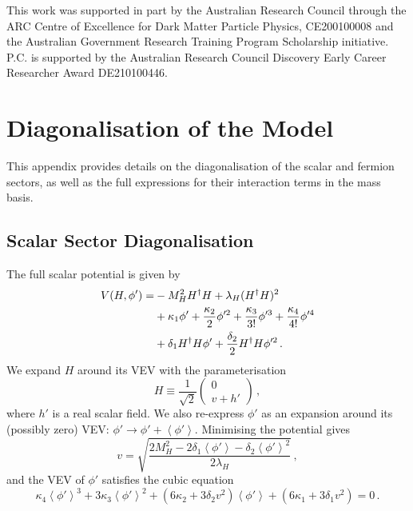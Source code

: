 \documentclass[aps, prd, reprint, nofootinbib, amsmath, amssymb, floatfix]{revtex4-2}
\newcommand{\vev}[1]{\left< #1 \right>}      %
\begin{document}

\begin{acknowledgments}
This work was supported in part by the Australian Research Council through the ARC Centre of Excellence for Dark Matter Particle Physics, CE200100008 and the Australian Government Research Training Program Scholarship initiative. P.C. is supported by the Australian Research Council Discovery Early Career Researcher Award DE210100446.
\end{acknowledgments}



\appendix

\section{\label{app:model_details} Diagonalisation of the Model}

This appendix provides details on the diagonalisation of the scalar and fermion sectors, as well as the full expressions for their interaction terms in the mass basis.


\subsection{Scalar Sector Diagonalisation}

The full scalar potential is given by
%
\begin{align}
    V(H,\phi') = & -M_H^2 H^\dag H + \lambda_H(H^\dag H)^2 \notag \\
    & + \kappa_{1} \phi' + \frac{\kappa_2}{2}\phi'^2 + \frac{\kappa_3}{3!}\phi'^3 + \frac{\kappa_4}{4!}\phi'^4 \notag \\
    & + \delta_1 H^\dag H \phi' + \frac{\delta_2}{2}H^\dag H \phi'^2 \,.
\end{align}
%
We expand $H$ around its VEV with the parameterisation
%
\begin{equation}
    H \equiv \frac{1}{\sqrt{2}} \begin{pmatrix}0 \\ v + h'\end{pmatrix} \,,
\end{equation}
%
where $h'$ is a real scalar field. We also re-express $\phi'$ as an expansion around its (possibly zero) VEV: $\phi' \to \phi' + \vev{\phi'}$. Minimising the potential gives
%
\begin{equation}
    v = \sqrt{\frac{2M_H^2 - 2\delta_1\vev{\phi'} - \delta_2 \vev{\phi'}^2}{2\lambda_H}} \,,
\end{equation}
%
and the VEV of $\phi'$ satisfies the cubic equation
%
\begin{equation}\label{eq:phi_cubic}
    \kappa_4\vev{\phi'}^3 + 3\kappa_3\vev{\phi'}^2 + \left(6\kappa_2 + 3\delta_2 v^2\right)\vev{\phi'} + \left(6\kappa_1 + 3\delta_1 v^2\right) = 0 \,.
\end{equation}
\end{document}
